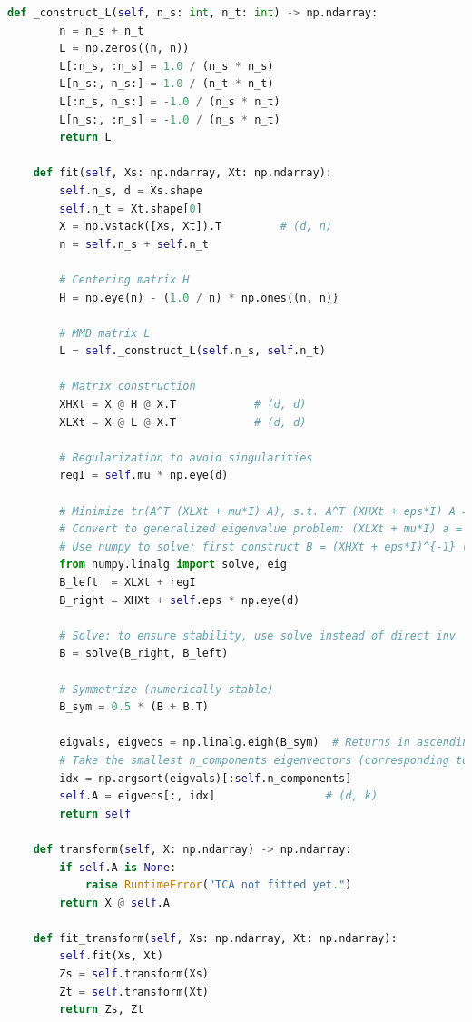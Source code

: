 \documentclass[a4paper]{CPIPC}
\numberwithin{equation}{section}
\begin{document}
\begin{lstlisting}[language=Python, caption=Random Forest Classifier]
    def _construct_L(self, n_s: int, n_t: int) -> np.ndarray:
        n = n_s + n_t
        L = np.zeros((n, n))
        L[:n_s, :n_s] = 1.0 / (n_s * n_s)
        L[n_s:, n_s:] = 1.0 / (n_t * n_t)
        L[:n_s, n_s:] = -1.0 / (n_s * n_t)
        L[n_s:, :n_s] = -1.0 / (n_s * n_t)
        return L

    def fit(self, Xs: np.ndarray, Xt: np.ndarray):
        self.n_s, d = Xs.shape
        self.n_t = Xt.shape[0]
        X = np.vstack([Xs, Xt]).T         # (d, n)
        n = self.n_s + self.n_t

        # Centering matrix H
        H = np.eye(n) - (1.0 / n) * np.ones((n, n))

        # MMD matrix L
        L = self._construct_L(self.n_s, self.n_t)

        # Matrix construction
        XHXt = X @ H @ X.T            # (d, d)
        XLXt = X @ L @ X.T            # (d, d)

        # Regularization to avoid singularities
        regI = self.mu * np.eye(d)

        # Minimize tr(A^T (XLXt + mu*I) A), s.t. A^T (XHXt + eps*I) A = I
        # Convert to generalized eigenvalue problem: (XLXt + mu*I) a = lambda (XHXt + eps*I) a
        # Use numpy to solve: first construct B = (XHXt + eps*I)^{-1} (XLXt + mu*I), then symmetrize and perform standard eigen-decomposition
        from numpy.linalg import solve, eig
        B_left  = XLXt + regI
        B_right = XHXt + self.eps * np.eye(d)

        # Solve: to ensure stability, use solve instead of direct inv
        B = solve(B_right, B_left)

        # Symmetrize (numerically stable)
        B_sym = 0.5 * (B + B.T)

        eigvals, eigvecs = np.linalg.eigh(B_sym)  # Returns in ascending order
        # Take the smallest n_components eigenvectors (corresponding to the smallest eigenvalues)
        idx = np.argsort(eigvals)[:self.n_components]
        self.A = eigvecs[:, idx]                 # (d, k)
        return self

    def transform(self, X: np.ndarray) -> np.ndarray:
        if self.A is None:
            raise RuntimeError("TCA not fitted yet.")
        return X @ self.A

    def fit_transform(self, Xs: np.ndarray, Xt: np.ndarray):
        self.fit(Xs, Xt)
        Zs = self.transform(Xs)
        Zt = self.transform(Xt)
        return Zs, Zt


\end{lstlisting}
\end{document}
